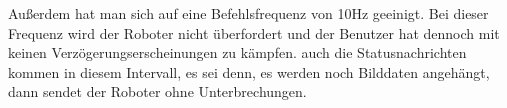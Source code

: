 Außerdem hat man sich auf eine Befehlsfrequenz von 10Hz geeinigt. Bei dieser Frequenz wird der Roboter nicht überfordert und der Benutzer hat dennoch mit keinen Verzögerungserscheinungen zu kämpfen. auch die Statusnachrichten kommen in diesem Intervall, es sei denn, es werden noch Bilddaten angehängt, dann sendet der Roboter ohne Unterbrechungen.                                                                                                                                                                                                                                                                                                                                                                                                                                                                                                                                                                                                                                                                                                                                                                                                                                                                                                                                                                                                                                                                                                                                                                                                                                                                                                                                                                                                                                                                                                                                                                                                                                                                                                                                                                                                                                                                                                                                                                                                                                                                                                                                                                                                                                                                                                                                                                                                                                                                                                                                                                                                                                                                                                                                                                                                                                                                                                                                                                                                                                                                                                            